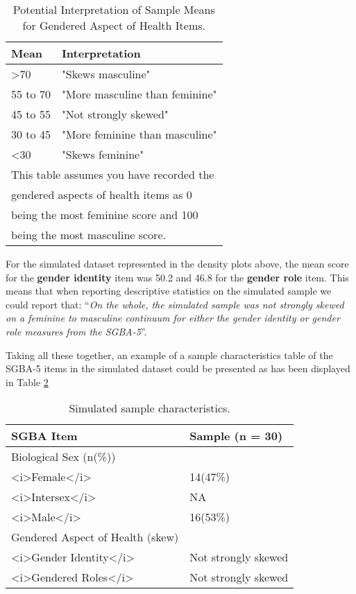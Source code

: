 \documentclass[
]{book}
\begin{document}
\begin{table}

\caption{\label{tab:02-tab}Potential Interpretation of Sample Means for Gendered Aspect of Health Items.}
\centering
\begin{tabular}[t]{ll}
\toprule
Mean & Interpretation\\
\midrule
>70 & "Skews masculine"\\
55 to 70 & "More masculine than feminine"\\
45 to 55 & "Not strongly skewed"\\
30 to 45 & "More feminine than masculine"\\
<30 & "Skews feminine"\\
\bottomrule
\multicolumn{2}{l}{\textsuperscript{} This table assumes you have recorded the}\\
\multicolumn{2}{l}{gendered aspects of health items as 0}\\
\multicolumn{2}{l}{being the most feminine score and 100}\\
\multicolumn{2}{l}{being the most masculine score.}\\
\end{tabular}
\end{table}

For the simulated dataset represented in the density plots above, the mean score for the \textbf{gender identity} item was 50.2 and 46.8 for the \textbf{gender role} item. This means that when reporting descriptive statistics on the simulated sample we could report that: ``\emph{On the whole, the simulated
sample was not strongly skewed on a feminine to masculine continuum for either the gender identity or gender role measures from the SGBA-5}''.

Taking all these together, an example of a sample characteristics table of the SGBA-5 items in the simulated dataset could be presented as has been displayed in Table \ref{tab:02-tab02}

\begin{table}

\caption{\label{tab:02-tab02}Simulated sample characteristics.}
\centering
\begin{tabular}[t]{ll}
\toprule
SGBA Item & Sample (n = 30)\\
\midrule
Biological Sex (n(\%)) & \\
<i>Female</i> & 14(47\%)\\
<i>Intersex</i> & NA\\
<i>Male</i> & 16(53\%)\\
Gendered Aspect of Health (skew) & \\
\addlinespace
<i>Gender Identity</i> & Not strongly skewed\\
<i>Gendered Roles</i> & Not strongly skewed\\
\bottomrule
\end{tabular}
\end{table}
\end{document}
